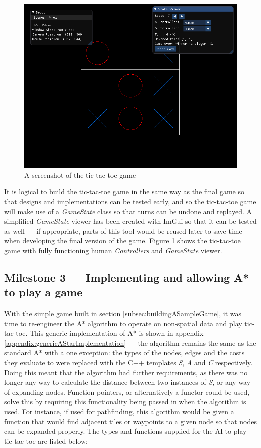 \documentclass[11pt, a4paper]{report}
\begin{document}
\begin{figure}[!h]
  \centering
  \includegraphics[width=\linewidth]{img/tictactoe_game.png}
  \caption{A screenshot of the tic-tac-toe game}
  \label{fig:ticTacToeGame}
\end{figure}

It is logical to build the tic-tac-toe game in the same way as the final game so that designs and implementations can be tested early, and so the tic-tac-toe game will make use of a \emph{GameState} class so that turns can be undone and replayed. A simplified \emph{GameState} viewer has been created with ImGui so that it can be tested as well --- if appropriate, parts of this tool would be reused later to save time when developing the final version of the game. Figure \ref{fig:ticTacToeGame} shows the tic-tac-toe game with fully functioning human \emph{Controllers} and \emph{GameState} viewer.

\subsection[Implementing and allowing A* to play a game]{Milestone 3 --- Implementing and allowing A* to play a game}
\label{subsec:implementingAndAllowingAStarToPlay}

With the simple game built in section \ref{subsec:buildingASampleGame}, it was time to re-engineer the A* algorithm to operate on non-spatial data and play tic-tac-toe. This generic implementation of A* is shown in appendix \ref{appendix:genericAStarImplementation} --- the algorithm remains the same as the standard A* with a one exception: the types of the nodes, edges and the costs they evaluate to were replaced with the C++ templates \emph{S}, \emph{A} and \emph{C} respectively. Doing this meant that the algorithm had further requirements, as there was no longer any way to calculate the distance between two instances of \emph{S}, or any way of expanding nodes. Function pointers, or alternatively a functor could be used, solve this by requiring this functionality being passed in when the algorithm is used. For instance, if used for pathfinding, this algorithm would be given a function that would find adjacent tiles or waypoints to a given node so that nodes can be expanded properly. The types and functions supplied for the AI to play tic-tac-toe are listed below:
\end{document}
